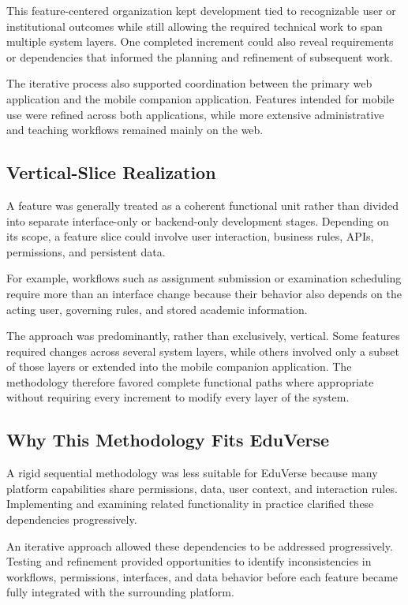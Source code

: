 This feature-centered organization kept development tied to recognizable user
or institutional outcomes while still allowing the required technical work to
span multiple system layers. One completed increment could also reveal
requirements or dependencies that informed the planning and refinement of
subsequent work.


The iterative process also supported coordination between the primary
web application and the mobile companion application. Features intended for mobile use were refined across both applications, while more extensive administrative and teaching workflows remained mainly on the web.

\subsection{Vertical-Slice Realization}\label{subsec:vertical_slice_development_approach}

A feature was generally treated as a coherent functional unit rather than
divided into separate interface-only or backend-only development stages.
Depending on its scope, a feature slice could involve user interaction,
business rules, APIs, permissions, and persistent data.

For example, workflows such as assignment submission or examination scheduling
require more than an interface change because their behavior also depends on
the acting user, governing rules, and stored academic information.

The approach was predominantly, rather than exclusively, vertical. Some
features required changes across several system layers, while others involved
only a subset of those layers or extended into the mobile companion
application. The methodology therefore favored complete functional paths where
appropriate without requiring every increment to modify every layer of the
system.

\subsection{Why This Methodology Fits EduVerse}\label{subsec:justification_for_methodology_selection}

A rigid sequential methodology was less suitable for EduVerse because many
platform capabilities share permissions, data, user context, and interaction
rules. Implementing and examining related functionality in practice clarified
these dependencies progressively.

An iterative approach allowed these dependencies to be addressed progressively.
Testing and refinement provided opportunities to identify inconsistencies in
workflows, permissions, interfaces, and data behavior before each feature
became fully integrated with the surrounding platform.


